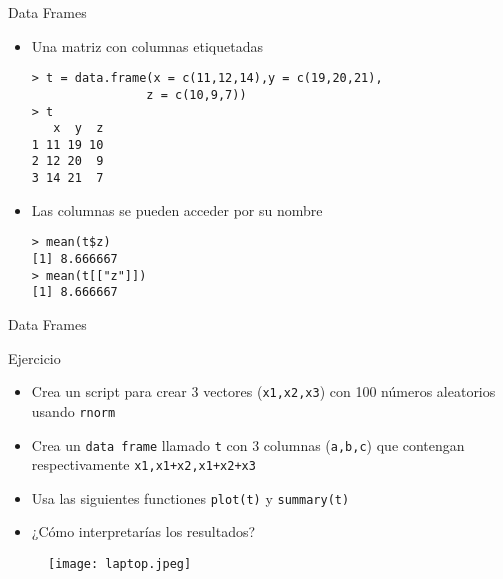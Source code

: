 \documentclass{beamer}
\begin{document}
\begin{frame}[fragile]{Data Frames}
\begin{itemize}
\item Una matriz con columnas etiquetadas
\begin{verbatim}
> t = data.frame(x = c(11,12,14),y = c(19,20,21),
			    z = c(10,9,7))
> t
   x  y  z
1 11 19 10
2 12 20  9
3 14 21  7
\end{verbatim}
\item Las columnas se pueden acceder por su nombre
\begin{verbatim}
> mean(t$z)
[1] 8.666667
> mean(t[["z"]])
[1] 8.666667
\end{verbatim}
\end{itemize}
\end{frame}


\begin{frame}[fragile]{Data Frames}
\begin{block}{Ejercicio}
\begin{itemize}
\item Crea un script para crear 3 vectores (\texttt{x1,x2,x3}) con 100 números aleatorios usando \verb=rnorm=
\item Crea un \texttt{data frame} llamado \verb=t= con 3 columnas (\texttt{a,b,c}) que contengan respectivamente \texttt{x1,x1+x2,x1+x2+x3}
\item Usa las siguientes functiones \texttt{plot(t)} y \texttt{summary(t)}
\item ¿Cómo interpretarías los resultados?
\end{itemize}
\end{block}
\begin{figure}[H]
\centering
\texttt{[image: laptop.jpeg]}
\end{figure}
\end{frame}

\end{document}
